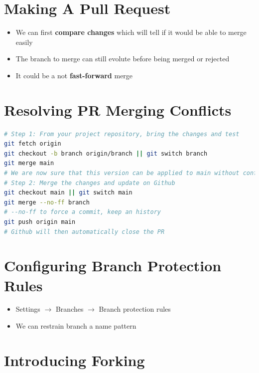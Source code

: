 \documentclass{report}
\begin{document}
\section{Making A Pull Request}

\begin{itemize}
	\item We can first \textbf{compare changes} which will tell if it would be able to merge easily 
	\item The branch to merge can still evolute before being merged or rejected 
	\item It could be a not \textbf{fast-forward} merge
\end{itemize}

\section{Resolving PR Merging Conflicts}

\begin{tcolorbox}[title=Checking out via command line,colback=backcolour]
\begin{lstlisting}[language=bash]
# Step 1: From your project repository, bring the changes and test
git fetch origin
git checkout -b branch origin/branch || git switch branch
git merge main
# We are now sure that this version can be applied to main without conflicts
# Step 2: Merge the changes and update on Github
git checkout main || git switch main
git merge --no-ff branch
# --no-ff to force a commit, keep an history
git push origin main
# Github will then automatically close the PR
\end{lstlisting}
\end{tcolorbox}

\section{Configuring Branch Protection Rules}

\begin{itemize}
	\item Settings $\rightarrow$ Branches $\rightarrow$ Branch protection rules 
	\item We can restrain branch a name pattern 
\end{itemize}

\section{Introducing Forking}
\end{document}
